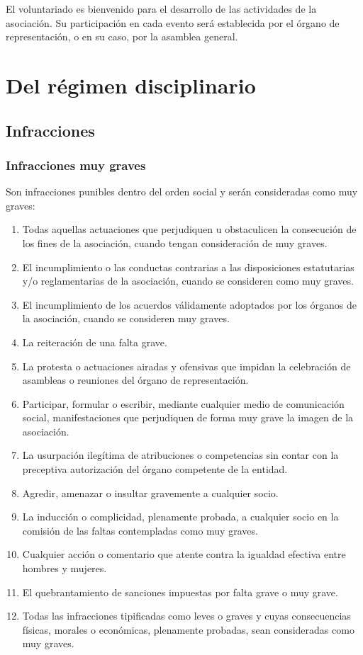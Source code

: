 \documentclass[a4paper, 12pt, oneside]{book}
\begin{document}
El voluntariado es bienvenido para el desarrollo de las actividades de la asociación. Su participación en cada evento será establecida por el órgano de representación, o en su caso, por la asamblea general.

\chapter{Del régimen disciplinario}

\section{Infracciones}

\subsection{Infracciones muy graves}

Son infracciones punibles dentro del orden social y serán consideradas como muy graves:

\begin{enumerate}
    \item Todas aquellas actuaciones que perjudiquen u obstaculicen la consecución de los fines de la asociación, cuando tengan consideración de muy graves.  
    \item El incumplimiento o las conductas contrarias a las disposiciones estatutarias y/o reglamentarias de la asociación, cuando se consideren como muy graves.  
    \item El incumplimiento de los acuerdos válidamente adoptados por los órganos de la asociación, cuando se consideren muy graves.  
    \item La reiteración de una falta grave.  
    \item La protesta o actuaciones airadas y ofensivas que impidan la celebración de asambleas o reuniones del órgano de representación.  
    \item Participar, formular o escribir, mediante cualquier medio de comunicación social, manifestaciones que perjudiquen de forma muy grave la imagen de la asociación.  
    \item La usurpación ilegítima de atribuciones o competencias sin contar con la preceptiva autorización del órgano competente de la entidad.  
    \item Agredir, amenazar o insultar gravemente a cualquier socio.  
    \item La inducción o complicidad, plenamente probada, a cualquier socio en la comisión de las faltas contempladas como muy graves.  
    \item Cualquier acción o comentario que atente contra la igualdad efectiva entre hombres y mujeres.  
    \item El quebrantamiento de sanciones impuestas por falta grave o muy grave.  
    \item Todas las infracciones tipificadas como leves o graves y cuyas consecuencias físicas, morales o económicas, plenamente probadas, sean consideradas como muy graves.
\end{enumerate}
\end{document}
